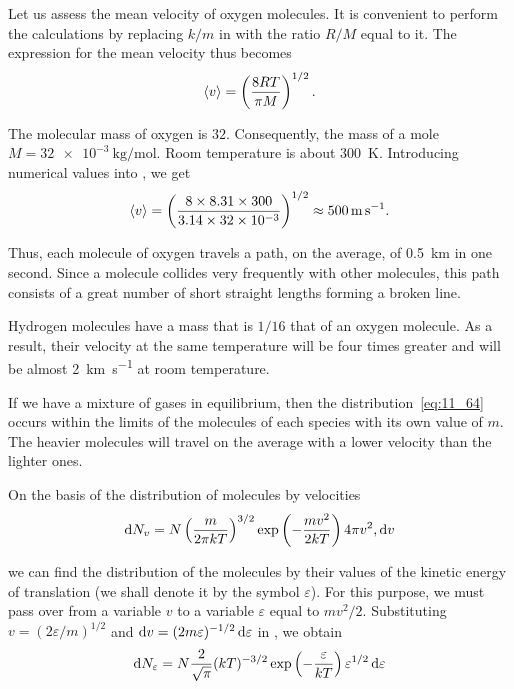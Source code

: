 Let us assess the mean velocity of oxygen molecules. It is convenient to perform the calculations by replacing $k/m$ in  with the ratio $R/M$ equal to it. The expression for the mean velocity thus becomes
\begin{equation}\label{eq:11_70}
	\left\langle v \right\rangle = \left(\frac{8RT}{\pi M}\right)^{1/2}.
\end{equation}

\noindent
The molecular mass of oxygen is $32$. Consequently, the mass of a mole $M=\SI{32e-3}{\kilo\gram\per\mole}$. Room temperature is about \SI{300}{\kelvin}. Introducing numerical values into , we get
\begin{equation*}
	\left\langle v \right\rangle = \left(\frac{8 \times 8.31 \times 300}{3.14 \times 32\times10^{-3}}\right)^{1/2} \approx \SI{500}{\metre\per\second}.
\end{equation*}

\noindent
Thus, each molecule of oxygen travels a path, on the average, of \SI{0.5}{\kilo\metre} in one second. Since a molecule collides very frequently with other molecules, this path consists of a great number of short straight lengths forming a broken line.

Hydrogen molecules have a mass that is $1/16$ that of an oxygen molecule. As a result, their velocity at the same temperature will be four times greater and will be almost \SI{2}{\kilo\metre\per\second} at room temperature.

If we have a mixture of gases in equilibrium, then the distribution~\eqref{eq:11_64} occurs within the limits of the molecules of each species with its own value of $m$. The heavier molecules will travel on the average with a lower velocity than the lighter ones.

On the basis of the distribution of molecules by velocities
\begin{equation}\label{eq:11_71}
	\mathrm{d} N_v = N \left(\frac{m}{2\pi kT}\right)^{3/2} \exp\left(-\frac{mv^2}{2kT}\right) 4\pi v^2,\mathrm{d} v
\end{equation}

\noindent
we can find the distribution of the molecules by their values of the kinetic energy of translation (we shall denote it by the symbol $\varepsilon$). For this purpose, we must pass over from a variable $v$ to a variable $\varepsilon$ equal to $mv^2/2$. Substituting $v=(2\varepsilon/m)^{1/2}$ and $\mathrm{d} v=(2m\varepsilon)^{-1/2}\,\mathrm{d}\varepsilon$ in , we obtain
\begin{equation}\label{eq:11_72}
	\mathrm{d} N_{\varepsilon} = N \frac{2}{\sqrt{\pi}} (kT)^{-3/2} \exp\left(-\frac{\varepsilon}{kT}\right) \varepsilon^{1/2}\,\mathrm{d}\varepsilon
\end{equation}

